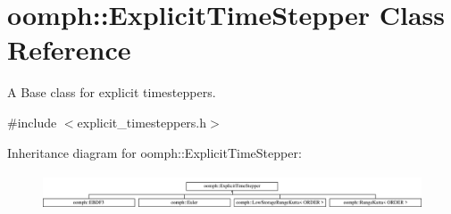 \hypertarget{classoomph_1_1ExplicitTimeStepper}{}\section{oomph\+:\+:Explicit\+Time\+Stepper Class Reference}
\label{classoomph_1_1ExplicitTimeStepper}


A Base class for explicit timesteppers.  




{\ttfamily \#include $<$explicit\+\_\+timesteppers.\+h$>$}

Inheritance diagram for oomph\+:\+:Explicit\+Time\+Stepper\+:\begin{figure}[H]
\begin{center}
\leavevmode
\includegraphics[height=1.072797cm]{classoomph_1_1ExplicitTimeStepper}
\end{center}
\end{figure}
